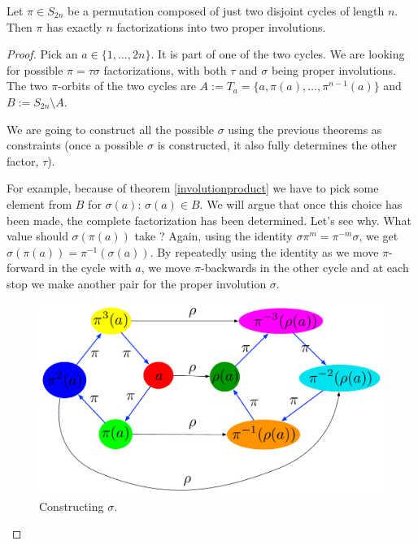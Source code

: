 \begin{thm}\label{involutionproduct5}
Let $\pi \in S_{2n}$ be a permutation composed of just two disjoint cycles of length $n$. Then $\pi$ has exactly $n$ factorizations into two proper involutions.
\end{thm}

\begin{proof}

Pick an $a \in \{1, \ldots, 2n\}$. It is part of one of the two cycles. We are looking for possible $\pi = \tau \sigma$ factorizations, with both $\tau$ and $\sigma$ being proper involutions.
The two $\pi$-orbits of the two cycles are $A := T_a = \{a, \pi(a), \ldots, \pi^{n-1}(a)\}$ and $B := S_{2n} \setminus A$.

We are going to construct all the possible $\sigma$ using the previous theorems as constraints (once a possible $\sigma$ is constructed, it also fully determines the other factor, $\tau$). 

For example, because of theorem \ref{involutionproduct} we have to pick some element from $B$ for $\sigma(a)$: $\sigma(a) \in B$. We will argue that once this choice has been made, the complete factorization has been determined. Let's see why. What value should $\sigma(\pi(a))$ take ? Again, using the identity $\sigma \pi^m = \pi^{-m} \sigma$, we get $\sigma(\pi(a)) = \pi^{-1}(\sigma(a))$. By repeatedly using the identity as we move $\pi$-forward in the cycle with $a$, we move $\pi$-backwards in the other cycle and at each stop we make another pair for the proper involution $\sigma$. 

\begin{figure}
\includegraphics[scale=0.35]{enigma1.pdf}
\caption{Constructing $\sigma$.}
\label{rhoconstructionexample}
\end{figure}


\end{proof}
